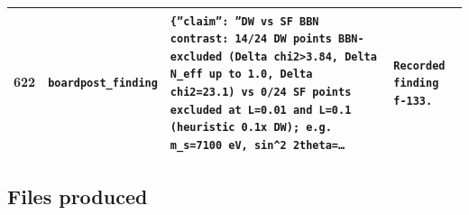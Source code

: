 \documentclass[11pt,a4paper]{article}
\begin{document}
\begin{longtable}{@{}p{}p{}p{}p{}@{}}
622 & \texttt{board}\newline\texttt{post\_\allowbreak{}finding} & \texttt{\{''claim'':\allowbreak{} ''DW vs SF BBN contrast:\allowbreak{} 14/\allowbreak{}24 DW points BBN-excluded (Delta chi2\textgreater{}\allowbreak{}3.84,\allowbreak{} Delta N\_\allowbreak{}eff up to 1.0,\allowbreak{} Delta chi2=\allowbreak{}23.1)\allowbreak{} vs 0/\allowbreak{}24 SF points excluded at L=\allowbreak{}0.01 and L=\allowbreak{}0.1 (heuristic 0.1x DW)\allowbreak{};\allowbreak{} e.g. m\_\allowbreak{}s=\allowbreak{}7100 eV,\allowbreak{} sin\textasciicircum{}\allowbreak{}2 2theta=\allowbreak{}\ldots{}\allowbreak{}} & \texttt{Recorded finding f-133.} \\
\bottomrule\end{longtable}
\subsection{Files produced}
\end{document}
